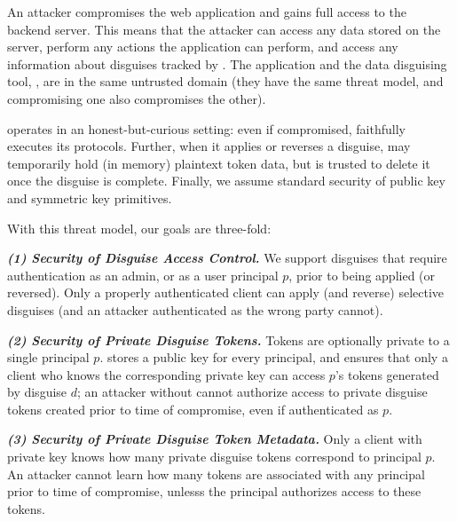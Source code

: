 An attacker compromises the web application and gains full access to the backend server.
%
This means that the attacker can access any data stored on the server, perform any actions the
application can perform, and access any information about disguises tracked by \sys.
%
The application and the data disguising tool, \sys, are in the same untrusted domain (\ie they
have the same threat model, and compromising one also compromises the other).
%

%
\sys operates in an honest-but-curious setting: even if compromised, \sys faithfully executes
its protocols.
%
Further, when it applies or reverses a disguise, \sys may temporarily
hold (in memory) plaintext token data, but is trusted to delete it once the disguise is
complete.
%
Finally, we assume standard security of public key and symmetric key primitives.

With this threat model, our goals are three-fold: 

\vspace{6pt}\noindent\textbf{\emph{(1) Security of Disguise Access Control.}}
We support disguises that require authentication as an admin, or as a user principal $p$, prior to being applied (or
reversed). Only a properly authenticated client can apply (and reverse) selective disguises
(and an attacker authenticated as the wrong party cannot).

\vspace{6pt}\noindent\textbf{\emph{(2) Security of Private Disguise Tokens.}}
Tokens are optionally private to a single principal $p$. 
\sys stores a public key  for every principal, and ensures that 
only a client who knows the corresponding private key  can access $p$'s tokens generated by
disguise $d$; an attacker without  cannot authorize access to private disguise tokens
created prior to time of compromise, even if authenticated as $p$.

\vspace{6pt}\noindent\textbf{\emph{(3) Security of Private Disguise Token Metadata.}}
Only a client with private key  knows how many private disguise tokens correspond to
principal $p$. An attacker cannot learn how many tokens are associated with any principal prior to
time of compromise, unlesss the principal authorizes access to these tokens.


